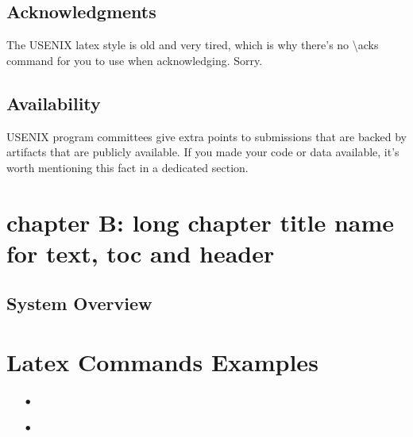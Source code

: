 \section*{Acknowledgments}

The USENIX latex style is old and very tired, which is why there's no \textbackslash{}acks command for you to use when acknowledging. Sorry.\par

\section*{Availability}

USENIX program committees give extra points to submissions that are backed by artifacts that are publicly available. If you made your code or data available, it's worth mentioning this fact in a dedicated section.\par

\chapter[chapter B: manage long chap name]{chapter B: long chapter title name for text, toc and header}
\zhlipsum[8-12]

\section{System Overview}
\zhlipsum[9-13]

\chapter{Latex Commands Examples}

\begin{itemize}
    \item[$\bullet$] \lipsum[1]
    \item[$\bullet$] \lipsum[2]
\end{itemize}
%
